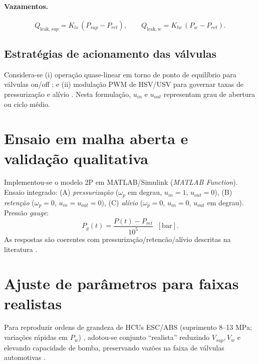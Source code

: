 \paragraph{Vazamentos.}
\begin{equation}
    Q_{\text{leak},sup}=K_{ls}\,(P_{sup}-P_{ret}),\qquad
    Q_{\text{leak},w}  =K_{lw}\,(P_{w}-P_{ret}).
    \label{eq:leaks}
\end{equation}

\subsection{Estratégias de acionamento das válvulas}
\label{sec:pwm-estrategias}

Considera-se (i) operação quase-linear em torno de ponto de equilíbrio para válvulas on/off \cite{ChenLv2017}; e (ii) modulação PWM de HSV/USV para governar taxas de pressurização e alívio \cite{HouhuaJing2022}. Nesta formulação, $u_{in}$ e $u_{out}$ representam grau de abertura ou ciclo médio.

\section{Ensaio em malha aberta e validação qualitativa}
\label{sec:ensaio-malha-aberta}

Implementou-se o modelo 2P em MATLAB/Simulink (\emph{MATLAB Function}). Ensaio integrado: (A) \emph{pressurização} ($\omega_p$ em degrau, $u_{in}=1$, $u_{out}=0$), (B) \emph{retenção} ($\omega_p=0$, $u_{in}=u_{out}=0$), (C) \emph{alívio} ($\omega_p=0$, $u_{in}=0$, $u_{out}$ em degrau). Pressão \emph{gauge}:
\begin{equation}
    P_g(t)=\frac{P(t)-P_{ret}}{10^5}\;\;[\mathrm{bar}].
    \label{eq:pressao_gauge_bar}
\end{equation}
As respostas são coerentes com pressurização/retencão/alívio descritas na literatura \cite{ZengYangHuang2023,Lv2014,HouhuaJing2022}.

\section{Ajuste de parâmetros para faixas realistas}
\label{sec:controle-ajuste-parametros-realistas}

Para reproduzir ordens de grandeza de HCUs ESC/ABS (suprimento 8–13 MPa; variações rápidas em $P_w$) \cite{ZengYangHuang2023,DesignESCUnitTestSystem2018,HouhuaJing2022}, adotou-se conjunto ``realista'' reduzindo $V_{sup},V_w$ e elevando capacidade de bomba, preservando vazões na faixa de válvulas automotivas \cite{ProportionalPressureABS2023,ChenLv2017,MotorParametricDesign2023}.

